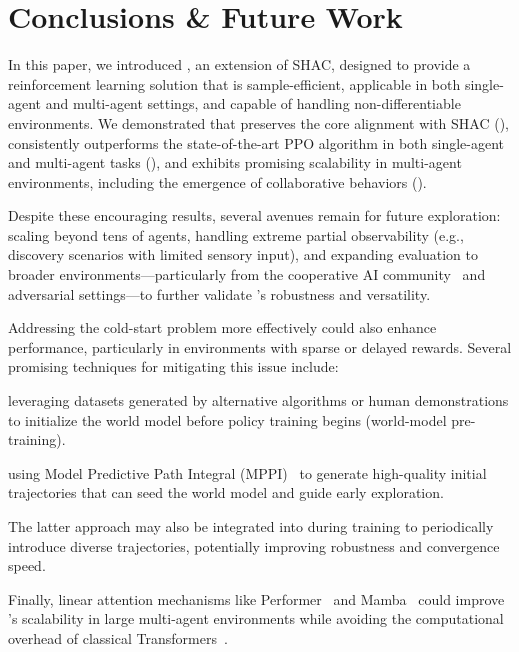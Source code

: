 
\section{Conclusions \& Future Work}\label{sect:conclusion}

In this paper, we introduced \fname{}, an extension of SHAC, designed to provide a reinforcement learning solution that is sample-efficient, applicable in both single-agent and multi-agent settings, and capable of handling non-differentiable environments. We demonstrated that \fname{} preserves the core alignment with SHAC (), consistently outperforms the state-of-the-art PPO algorithm in both single-agent and multi-agent tasks (), and exhibits promising scalability in multi-agent environments, including the emergence of collaborative behaviors ().

Despite these encouraging results, several avenues remain for future exploration: scaling beyond tens of agents, handling extreme partial observability (e.g., discovery scenarios with limited sensory input), and expanding evaluation to broader environments---particularly from the cooperative AI community~\cite{DBLP:journals/corr/abs-2211-13746} and adversarial settings—to further validate \fname{}'s robustness and versatility.

Addressing the cold-start problem more effectively could also enhance performance, particularly in environments with sparse or delayed rewards. Several promising techniques for mitigating this issue include:
\begin{enumerate*}[label=\emph{\roman*})]
    \item leveraging datasets generated by alternative algorithms or human demonstrations to initialize the world model before policy training begins (world-model pre-training).
    \item using Model Predictive Path Integral (MPPI)~\cite{Alvarez24}  to generate high-quality initial trajectories that can seed the world model and guide early exploration.
\end{enumerate*}
%
The latter approach may also be integrated into \fname{} during training to periodically introduce diverse trajectories, potentially improving robustness and convergence speed.

Finally, linear attention mechanisms like Performer~\cite{Choromanski20} and Mamba~\cite{Gu23} could improve \fname{}'s scalability in large multi-agent environments while avoiding the computational overhead of classical Transformers~\cite{Vaswani17}.

